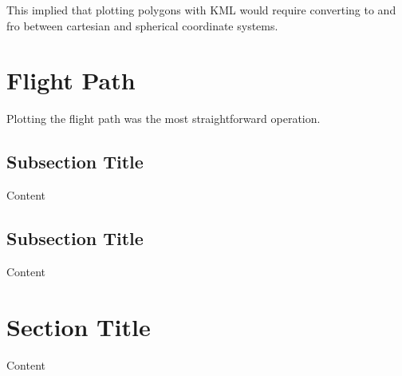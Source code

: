 This implied that plotting polygons with KML would require converting to and fro between cartesian and spherical coordinate systems.

\section{Flight Path}

Plotting the flight path was the most straightforward operation.


\subsection{Subsection Title}

Content


\subsection{Subsection Title}

Content


\section{Section Title}

Content
